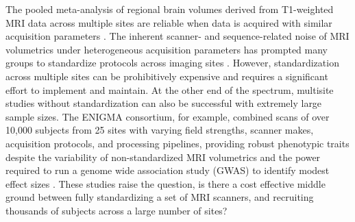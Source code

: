 The pooled meta-analysis of regional brain volumes derived from T1-weighted MRI data across multiple sites are reliable when data is acquired with similar acquisition parameters \cite{cannon2014,multicenter01,freesurferreliability}. The inherent scanner- and sequence-related noise of MRI volumetrics under heterogeneous acquisition parameters has prompted many groups to standardize protocols across imaging sites \cite{cannon2014,adniharmonize,ADNIReview}. However, standardization across multiple sites can be prohibitively expensive and requires a significant effort to implement and maintain. %
At the other end of the spectrum, multisite studies without standardization can also be successful with extremely large sample sizes. The ENIGMA consortium, for example, combined scans of over 10,000 subjects from 25 sites with varying field strengths, scanner makes, acquisition protocols, and processing pipelines, providing robust phenotypic traits despite the variability of non-standardized MRI volumetrics and the power required to run a genome wide association study (GWAS) to identify modest effect sizes \cite{thompson2014enigma}. These studies raise the question, is there a cost effective middle ground between fully standardizing a set of MRI scanners, and recruiting thousands of subjects across a large number of sites? %